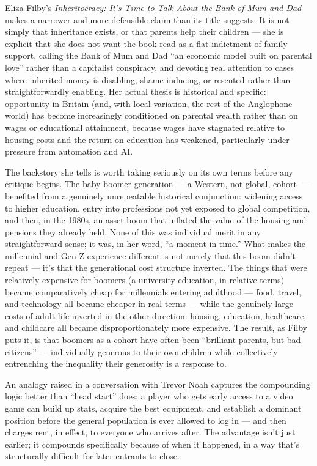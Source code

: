 \documentclass[11pt]{article}
\begin{document}
Eliza Filby's \emph{Inheritocracy: It's Time to Talk About the Bank of Mum and Dad} makes a narrower and more defensible claim than its title suggests. It is not simply that inheritance exists, or that parents help their children --- she is explicit that she does not want the book read as a flat indictment of family support, calling the Bank of Mum and Dad ``an economic model built on parental love'' rather than a capitalist conspiracy, and devoting real attention to cases where inherited money is disabling, shame-inducing, or resented rather than straightforwardly enabling. Her actual thesis is historical and specific: opportunity in Britain (and, with local variation, the rest of the Anglophone world) has become increasingly conditioned on parental wealth rather than on wages or educational attainment, because wages have stagnated relative to housing costs and the return on education has weakened, particularly under pressure from automation and AI.

The backstory she tells is worth taking seriously on its own terms before any critique begins. The baby boomer generation --- a Western, not global, cohort --- benefited from a genuinely unrepeatable historical conjunction: widening access to higher education, entry into professions not yet exposed to global competition, and then, in the 1980s, an asset boom that inflated the value of the housing and pensions they already held. None of this was individual merit in any straightforward sense; it was, in her word, ``a moment in time.'' What makes the millennial and Gen Z experience different is not merely that this boom didn't repeat --- it's that the generational cost structure inverted. The things that were relatively expensive for boomers (a university education, in relative terms) became comparatively cheap for millennials entering adulthood --- food, travel, and technology all became cheaper in real terms --- while the genuinely large costs of adult life inverted in the other direction: housing, education, healthcare, and childcare all became disproportionately more expensive. The result, as Filby puts it, is that boomers as a cohort have often been ``brilliant parents, but bad citizens'' --- individually generous to their own children while collectively entrenching the inequality their generosity is a response to.

An analogy raised in a conversation with Trevor Noah captures the compounding logic better than ``head start'' does: a player who gets early access to a video game can build up stats, acquire the best equipment, and establish a dominant position before the general population is ever allowed to log in --- and then charges rent, in effect, to everyone who arrives after. The advantage isn't just earlier; it compounds specifically because of when it happened, in a way that's structurally difficult for later entrants to close.
\end{document}
